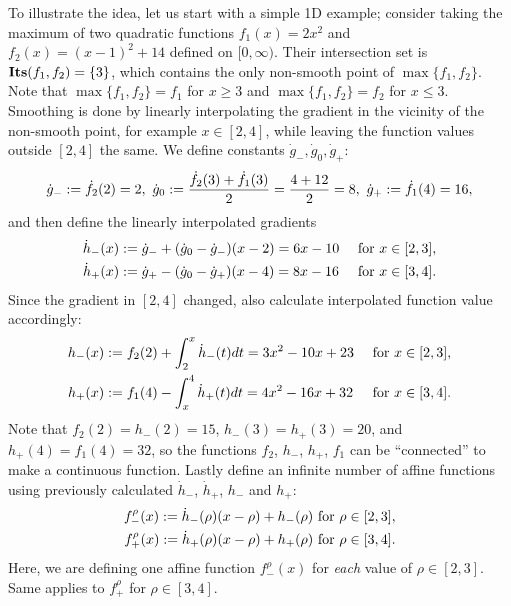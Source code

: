 To illustrate the idea, let us start with a simple 1D example; 
consider taking the maximum of 
two quadratic functions $f_1(x) = 2x^2$ and $f_2(x) = (x-1)^2 + 14$ defined on $[0, \infty)$. 
Their intersection set is $\mathbf{Its}({f_1},{f_2})= \{ 3 \}$, 
which contains the only non-smooth point of $\max\{f_1, f_2\}$.
Note that $\max\{f_1, f_2\} = f_1$ for $x \geq 3$ and $\max\{f_1, f_2\} = f_2$ for $x \leq 3$.
Smoothing is done by linearly interpolating the gradient in the vicinity 
of the non-smooth point, for example $x \in [2,4]$, 
while leaving the function values outside $[2,4]$ the same.
We define constants $\dot g_-, \dot g_0, \dot g_+$:
\begin{equation*}
	\dot g_- := \dot f_2(2) = 2, ~
	\dot g_0 := \frac{\dot f_2(3)+\dot f_1(3)}{2} = \frac{4+12}{2} = 8, ~
	\dot g_+ := \dot f_1(4) = 16,
\end{equation*}
and then define the linearly interpolated gradients
\begin{align*}
	\dot h_-(x) &:= \dot g_- + (\dot g_0 - \dot g_-) (x-2) = 6x-10 & \text{ for } x \in [2,3],\\
	\dot h_+(x) &:= \dot g_+ - (\dot g_0 - \dot g_+) (x-4) = 8x-16 & \text{ for } x \in [3,4].
\end{align*}
Since the gradient in $[2,4]$ changed, also calculate interpolated function value accordingly:
\begin{align*}
	h_-(x) & := f_2(2) + \int_2^x \dot h_-(t) dt = 3x^2-10x+23 & \text{ for } x \in [2,3],\\
	h_+(x)& := f_1(4) - \int_x^4 \dot h_+(t) dt = 4x^2-16x+32 & \text{ for } x \in [3,4].
\end{align*}
Note that $f_2(2) = h_-(2) = 15$, $h_-(3) = h_+(3) = 20$, and $h_+(4) = f_1(4) = 32$,
so the functions $f_2$, $h_-$, $h_+$, $f_1$ can be ``connected'' to make a continuous function.
Lastly define an infinite number of affine functions using previously calculated $\dot h_-$, $\dot h_+$, $h_-$ and $h_+$:
\begin{align*}
	f_-^\rho(x) := \dot h_-(\rho)(x-\rho)+h_-(\rho) & \text{ for } \rho \in [2,3],\\
	f_+^\rho(x) := \dot h_+(\rho)(x-\rho)+h_+(\rho) & \text{ for } \rho \in [3,4].
\end{align*}
Here, we are defining one affine function $f_-^\rho(x)$ for \emph{each} value of $\rho \in [2,3]$. Same applies to $f_+^\rho$ for $\rho \in [3,4]$.

